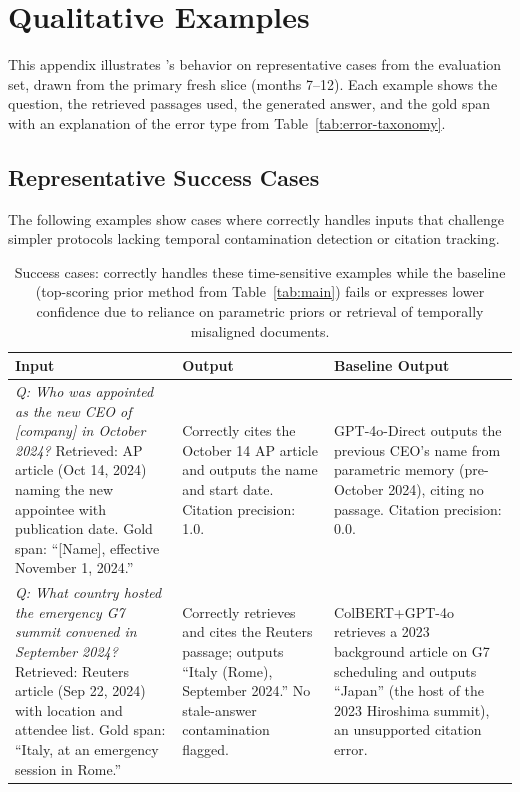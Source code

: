 \section{Qualitative Examples}
\label{app:qualitative}

This appendix illustrates \method{}'s behavior on representative cases from the evaluation set, drawn from the primary fresh slice (months 7--12). Each example shows the question, the retrieved passages used, the generated answer, and the gold span with an explanation of the error type from Table~\ref{tab:error-taxonomy}.

\subsection{Representative Success Cases}

The following examples show cases where \method{} correctly handles inputs that challenge simpler protocols lacking temporal contamination detection or citation tracking.

\begin{table}[t]
\centering
\small
\begin{tabular}{p{3.5cm}p{3.5cm}p{2.5cm}}
\toprule
Input & \method{} Output & Baseline Output \\
\midrule
\emph{Q: Who was appointed as the new CEO of [company] in October 2024?}
Retrieved: AP article (Oct 14, 2024) naming the new appointee with publication date.
Gold span: ``[Name], effective November 1, 2024.'' &
Correctly cites the October 14 AP article and outputs the name and start date. Citation precision: 1.0. &
GPT-4o-Direct outputs the previous CEO's name from parametric memory (pre-October 2024), citing no passage. Citation precision: 0.0. \\
\addlinespace
\emph{Q: What country hosted the emergency G7 summit convened in September 2024?}
Retrieved: Reuters article (Sep 22, 2024) with location and attendee list.
Gold span: ``Italy, at an emergency session in Rome.'' &
Correctly retrieves and cites the Reuters passage; outputs ``Italy (Rome), September 2024.'' No stale-answer contamination flagged. &
ColBERT+GPT-4o retrieves a 2023 background article on G7 scheduling and outputs ``Japan'' (the host of the 2023 Hiroshima summit), an unsupported citation error. \\
\bottomrule
\end{tabular}
\caption{Success cases: \method{} correctly handles these time-sensitive examples while the baseline (top-scoring prior method from Table~\ref{tab:main}) fails or expresses lower confidence due to reliance on parametric priors or retrieval of temporally misaligned documents.}
\label{tab:qual-success}
\end{table}

